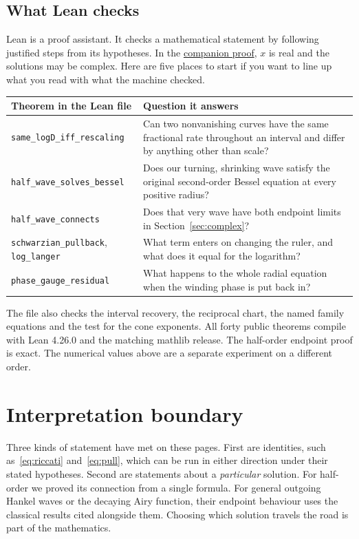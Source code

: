\documentclass[11pt,a4paper]{amsart}
\newcommand{\leanlink}{https://github.com/nickyazdani9-ux/mathematical-physics/blob/a90261232941f4dda5e8e8471cd1a58b3a053f52/mathematics/riccati_odes/RiccatiZoo.lean}
\theoremstyle{definition}
\theoremstyle{remark}
\begin{document}
\subsection{What Lean checks}
Lean is a proof assistant. It checks a mathematical statement by following justified steps from its hypotheses. In the \href{\leanlink}{companion proof}, \(x\) is real and the solutions may be complex. Here are five places to start if you want to line up what you read with what the machine checked.
\begin{center}\small
\begin{tabularx}{\linewidth}{@{}lY@{}}
\toprule
Theorem in the Lean file & Question it answers\\
\midrule
\texttt{same\_logD\_iff\_rescaling} & Can two nonvanishing curves have the same fractional rate throughout an interval and differ by anything other than scale?\\
\texttt{half\_wave\_solves\_bessel} & Does our turning, shrinking wave satisfy the original second-order Bessel equation at every positive radius?\\
\texttt{half\_wave\_connects} & Does that very wave have both endpoint limits in Section~\ref{sec:complex}?\\
\texttt{schwarzian\_pullback}, \texttt{log\_langer} & What term enters on changing the ruler, and what does it equal for the logarithm?\\
\texttt{phase\_gauge\_residual} & What happens to the whole radial equation when the winding phase is put back in?\\
\bottomrule
\end{tabularx}
\end{center}
The file also checks the interval recovery, the reciprocal chart, the named family equations and the test for the cone exponents. All forty public theorems compile with Lean 4.26.0 and the matching mathlib release. The half-order endpoint proof is exact. The numerical values above are a separate experiment on a different order.

\section{Interpretation boundary}
Three kinds of statement have met on these pages. First are identities, such as~\eqref{eq:riccati} and~\eqref{eq:pull}, which can be run in either direction under their stated hypotheses. Second are statements about a \emph{particular} solution. For half-order we proved its connection from a single formula. For general outgoing Hankel waves or the decaying Airy function, their endpoint behaviour uses the classical results cited alongside them. Choosing which solution travels the road is part of the mathematics.
\end{document}
